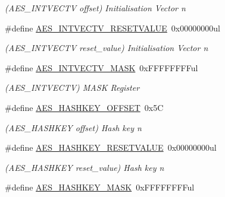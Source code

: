 \begin{DoxyCompactItemize}
\begin{DoxyCompactList}\small\item\em (A\+E\+S\+\_\+\+I\+N\+T\+V\+E\+C\+T\+V offset) Initialisation Vector n \end{DoxyCompactList}\item 
\hypertarget{group___s_a_m_l21___a_e_s_gaf925266e565155a6b467e88c6341c270}{}\#define \hyperlink{group___s_a_m_l21___a_e_s_gaf925266e565155a6b467e88c6341c270}{A\+E\+S\+\_\+\+I\+N\+T\+V\+E\+C\+T\+V\+\_\+\+R\+E\+S\+E\+T\+V\+A\+L\+U\+E}~0x00000000ul\label{group___s_a_m_l21___a_e_s_gaf925266e565155a6b467e88c6341c270}

\begin{DoxyCompactList}\small\item\em (A\+E\+S\+\_\+\+I\+N\+T\+V\+E\+C\+T\+V reset\+\_\+value) Initialisation Vector n \end{DoxyCompactList}\item 
\hypertarget{group___s_a_m_l21___a_e_s_gaec52e9f6855e8ef708bccb15554f07f2}{}\#define \hyperlink{group___s_a_m_l21___a_e_s_gaec52e9f6855e8ef708bccb15554f07f2}{A\+E\+S\+\_\+\+I\+N\+T\+V\+E\+C\+T\+V\+\_\+\+M\+A\+S\+K}~0x\+F\+F\+F\+F\+F\+F\+F\+Ful\label{group___s_a_m_l21___a_e_s_gaec52e9f6855e8ef708bccb15554f07f2}

\begin{DoxyCompactList}\small\item\em (A\+E\+S\+\_\+\+I\+N\+T\+V\+E\+C\+T\+V) M\+A\+S\+K Register \end{DoxyCompactList}\item 
\hypertarget{group___s_a_m_l21___a_e_s_ga3de03bc2ec0bd79c019df510cea8fea6}{}\#define \hyperlink{group___s_a_m_l21___a_e_s_ga3de03bc2ec0bd79c019df510cea8fea6}{A\+E\+S\+\_\+\+H\+A\+S\+H\+K\+E\+Y\+\_\+\+O\+F\+F\+S\+E\+T}~0x5\+C\label{group___s_a_m_l21___a_e_s_ga3de03bc2ec0bd79c019df510cea8fea6}

\begin{DoxyCompactList}\small\item\em (A\+E\+S\+\_\+\+H\+A\+S\+H\+K\+E\+Y offset) Hash key n \end{DoxyCompactList}\item 
\hypertarget{group___s_a_m_l21___a_e_s_gaa08592d15b578a0cadb9dbe80b6a861c}{}\#define \hyperlink{group___s_a_m_l21___a_e_s_gaa08592d15b578a0cadb9dbe80b6a861c}{A\+E\+S\+\_\+\+H\+A\+S\+H\+K\+E\+Y\+\_\+\+R\+E\+S\+E\+T\+V\+A\+L\+U\+E}~0x00000000ul\label{group___s_a_m_l21___a_e_s_gaa08592d15b578a0cadb9dbe80b6a861c}

\begin{DoxyCompactList}\small\item\em (A\+E\+S\+\_\+\+H\+A\+S\+H\+K\+E\+Y reset\+\_\+value) Hash key n \end{DoxyCompactList}\item 
\hypertarget{group___s_a_m_l21___a_e_s_ga83df005ae089b7f19cf8ea39c15de70f}{}\#define \hyperlink{group___s_a_m_l21___a_e_s_ga83df005ae089b7f19cf8ea39c15de70f}{A\+E\+S\+\_\+\+H\+A\+S\+H\+K\+E\+Y\+\_\+\+M\+A\+S\+K}~0x\+F\+F\+F\+F\+F\+F\+F\+Ful\label{group___s_a_m_l21___a_e_s_ga83df005ae089b7f19cf8ea39c15de70f}


\end{DoxyCompactItemize}
